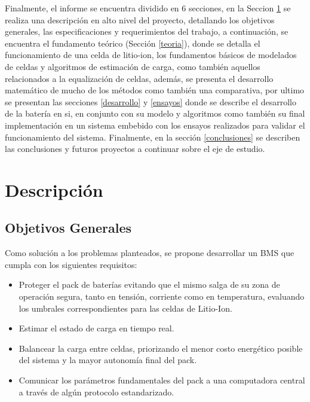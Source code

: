 \documentclass[10pt,a4paper]{article}
\begin{document}
\noindent Finalmente, el informe se encuentra dividido en 6 secciones, en
la Seccion \ref{descripcion} se realiza una descripci\'on en alto nivel del
proyecto, detallando los objetivos generales, las especificaciones y
requerimientos del trabajo, a continuaci\'on, se encuentra el fundamento 
te\'orico (Secci\'on \ref{teoria}), donde se detalla el funcionamiento de una 
celda de litio-ion, los fundamentos b\'asicos de modelados de celdas y 
algoritmos de estimaci\'on de carga, como tambi\'en aquellos relacionados a la 
equalizaci\'on de celdas, adem\'as, se presenta el desarrollo matem\'atico de 
mucho de los m\'etodos como tambi\'en una comparativa, por ultimo se presentan 
las secciones \ref{desarrollo} y \ref{ensayos} donde se describe el desarrollo 
de la bater\'ia en si, en conjunto con su modelo y algoritmos como tambi\'en su 
final implementaci\'on en un sistema embebido con los ensayos realizados para 
validar el funcionamiento del sistema. Finalmente, en la secci\'on 
\ref{conclusiones} se describen las conclusiones y futuros proyectos a continuar 
sobre el eje de estudio.

\section{Descripci\'on}\label{descripcion}

\subsection{Objetivos Generales}

Como solución a los problemas planteados, se propone desarrollar un 
\acrshort{BMS} que cumpla con los siguientes requisitos:

\begin{itemize}
    \item Proteger el pack de baterías evitando que el mismo salga de su 
	zona de operación segura, tanto en tensión, corriente como en 
	temperatura, evaluando los umbrales correspondientes para las celdas de 
    Litio-Ion.
    \item Estimar el estado de carga en tiempo real.
    \item Balancear la carga entre celdas, priorizando el menor costo 
	energético posible del sistema y la mayor autonomía final del pack.
    \item Comunicar los parámetros fundamentales del pack a una computadora 
	central a través de algún protocolo estandarizado.
\end{itemize}
\end{document}
